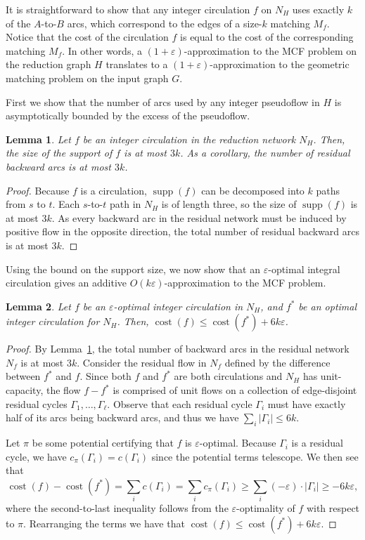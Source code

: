 \documentclass[11pt]{article}
\def\eps{\varepsilon}
\def\cost{\operatorname{cost}}
\def\supp{\operatorname{supp}}
\theoremstyle{plain}
\newtheorem{lemma}{Lemma}[section]
\numberwithin{figure}{section}
\def\EMPH#1{\textbf{\boldmath #1}}
\begin{document}
It is straightforward to show that any integer circulation $f$ on $N_H$ uses exactly
$k$ of the $A$-to-$B$ arcs, which correspond to the edges of a size-$k$
matching \EMPH{$M_f$}.
Notice that the cost of the circulation $f$ is equal to the cost of the corresponding matching $M_f$.
%
In other words, a $(1+\eps)$-approximation to the MCF problem on the reduction graph $H$ translates to a $(1+\eps)$-approximation to the geometric matching problem on the input graph $G$.

First we show that the number of arcs used by any integer pseudoflow
in $H$ is asymptotically bounded by the excess of the pseudoflow.

\begin{lemma}
\label{lemma:support_size}
Let $f$ be an integer circulation in the reduction network $N_H$.
Then, the size of the support of $f$ is at most $3k$.
As a corollary, the number of residual backward arcs is at most $3k$.
\end{lemma}

\begin{proof}
Because $f$ is a circulation, $\supp(f)$ can be decomposed into $k$  paths from $s$ to $t$.
Each $s$-to-$t$ path in $N_H$ is of length three, so the size of $\supp(f)$ is at most $3k$.
As every backward arc in the residual network must be induced by positive flow in the opposite direction,
the total number of residual backward arcs is at most $3k$.
\end{proof}

Using the bound on the support size, we now show that an $\eps$-optimal integral circulation gives an additive $O(k\eps)$-approximation to the MCF problem.

\begin{lemma}
\label{lemma:goldberg_cost_add}
Let $f$ be an $\eps$-optimal integer circulation in $N_H$, and $f^*$ be an optimal integer circulation for $N_H$.
Then, $\cost(f) \leq \cost(f^*) + 6k\eps$.
\end{lemma}

\begin{proof}
By Lemma~\ref{lemma:support_size}, the total number of backward arcs in the residual network $N_f$ is at most $3k$.
%
Consider the residual flow in $N_f$ defined by the difference between $f^*$ and $f$.
Since both $f$ and $f^*$ are both circulations and $N_H$ has unit-capacity,
the flow $f - f^*$ is comprised of unit flows on a collection of edge-disjoint residual cycles $\Gamma_1, \ldots, \Gamma_\ell$.
Observe that each residual cycle $\Gamma_i$ must have exactly half of its arcs being backward arcs, and thus we have $\sum_i |\Gamma_i| \leq 6k$.

Let $\pi$ be some potential certifying that $f$ is $\eps$-optimal.
Because $\Gamma_i$ is a residual cycle, we have $c_\pi(\Gamma_i) = c(\Gamma_i)$ since the potential terms telescope.
We then see that
\[
	\cost(f) - \cost(f^*)
	= \sum_i c(\Gamma_i)
	= \sum_i c_\pi(\Gamma_i)
	\geq \sum_i (-\eps) \cdot |\Gamma_i|
	\geq -6k\eps,
\]
where the second-to-last inequality follows from the $\eps$-optimality of $f$
with respect to $\pi$.
Rearranging the terms we have that $\cost(f) \leq \cost(f^*) + 6k\eps$.
\end{proof}
\end{document}
